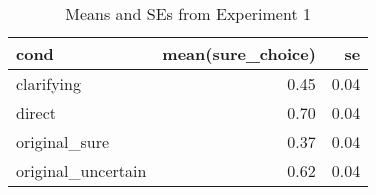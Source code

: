 \begin{table}[ht]
\centering
\caption{Means and SEs from Experiment 1} 
\label{table:means}
\begin{tabular}{lrr}
  \hline
cond & mean(sure\_choice) & se \\ 
  \hline
clarifying & 0.45 & 0.04 \\ 
  direct & 0.70 & 0.04 \\ 
  original\_sure & 0.37 & 0.04 \\ 
  original\_uncertain & 0.62 & 0.04 \\ 
   \hline
\end{tabular}
\end{table}
